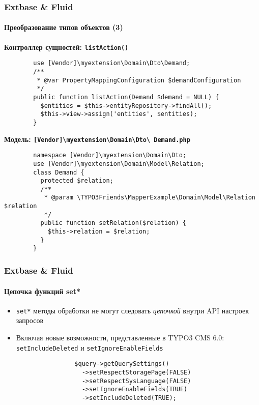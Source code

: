 \begin{frame}[fragile]
	\frametitle{Extbase \& Fluid}
	\framesubtitle{Преобразование типов объектов (3)}

	\lstset{
		basicstyle=\tiny\ttfamily
	}

	\smaller\textbf{Контроллер сущностей: \texttt{listAction()}}\normalsize
	\begin{lstlisting}
		use [Vendor]\myextension\Domain\Dto\Demand;
		/**
		 * @var PropertyMappingConfiguration $demandConfiguration
		 */
		public function listAction(Demand $demand = NULL) {
		  $entities = $this->entityRepository->findAll();
		  $this->view->assign('entities', $entities);
		}
	\end{lstlisting}

	\smaller\textbf{Модель: \texttt{[Vendor]\textbackslash myextension\textbackslash Domain\textbackslash Dto\textbackslash
	Demand.php}}\normalsize
	\begin{lstlisting}
		namespace [Vendor]\myextension\Domain\Dto;
		use [Vendor]\myextension\Domain\Model\Relation;
		class Demand {
		  protected $relation;
		  /**
		   * @param \TYPO3Friends\MapperExample\Domain\Model\Relation $relation
		   */
		  public function setRelation($relation) {
		    $this->relation = $relation;
		  }
		}
	\end{lstlisting}

\end{frame}


\begin{frame}[fragile]
	\frametitle{Extbase \& Fluid}
	\framesubtitle{Цепочка функций set*}

	\lstset{
		basicstyle=\tiny\ttfamily
	}

	\begin{itemize}
		\item \texttt{set*} методы обработки не могут следовать \emph{цепочкой} внутри API настроек запросов
		\item Включая новые возможности, представленные в TYPO3 CMS 6.0:\newline
			\texttt{setIncludeDeleted} и \texttt{setIgnoreEnableFields}

			\begin{lstlisting}
				$query->getQuerySettings()
				  ->setRespectStoragePage(FALSE)
				  ->setRespectSysLanguage(FALSE)
				  ->setIgnoreEnableFields(TRUE)
				  ->setIncludeDeleted(TRUE);
			\end{lstlisting}
	\end{itemize}

\end{frame}

